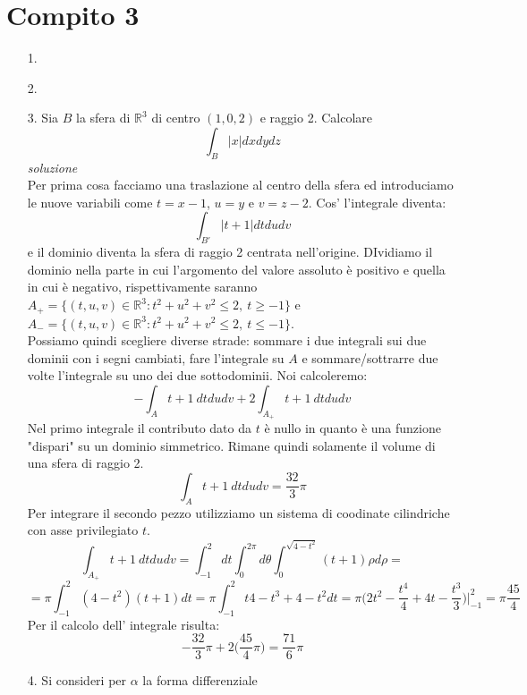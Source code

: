 \documentclass[a4paper]{article}
\begin{document}
\section*{Compito 3}
\begin{itemize}
\item [1.]
\item [2.]
\item [3.] Sia $B$ la sfera di $\mathbb{R}^3$ di centro $(1,0,2)$ e raggio 2. Calcolare
\begin{equation*}
\int_{B} |x| dxdydz
\end{equation*}
\emph{soluzione}\\
Per prima cosa facciamo una traslazione al centro della sfera ed introduciamo le nuove variabili come $t = x -1$, $u = y$ e $v = z -2$. Cos' l'integrale diventa:
\begin{equation}
\int_{B'} |t + 1| dtdudv
\end{equation}
e il dominio diventa la sfera di raggio 2 centrata nell'origine. DIvidiamo il dominio nella parte in cui l'argomento del valore assoluto è positivo e quella in cui è negativo, rispettivamente saranno \\$A_{+} = \{(t, u,v) \in \mathbb{R}^3 : t^2 + u^2 + v^2 \le 2, \: t \ge -1\}$ e \\$A_{-} = \{(t,u,v) \in \mathbb{R}^3 :t^2 + u^2 + v^2 \le 2, \: t \le -1\}$.\\
Possiamo quindi scegliere diverse strade: sommare i due integrali sui due dominii con i segni cambiati, fare l'integrale su $A$ e sommare/sottrarre due volte l'integrale su uno dei due sottodominii. Noi calcoleremo:
\begin{equation}
-\int_A t + 1 \: dtdudv + 2 \int_{A_{+}} t + 1 \: dtdudv
\end{equation}
Nel primo integrale il contributo dato da $t$ è nullo in quanto è una funzione "dispari" su un dominio simmetrico. Rimane quindi solamente il volume di una sfera di raggio 2.
\begin{equation}
\int_A t+1 \: dtdudv = \frac{32}{3} \pi
\end{equation}
Per integrare il secondo pezzo utilizziamo un sistema di coodinate cilindriche con asse privilegiato $t$. 
\begin{equation}
\int_{A_{+}} t+ 1 \: dtdudv = \int_{-1}^{2}dt \int_0^{2\pi} d\theta \int_{0}^{\sqrt{4-t^2}} (t+1) \rho d\rho =
\end{equation}
\begin{equation*}
=\pi \int_{-1}^{2} (4- t^2)(t + 1) dt = \pi \int_{-1}^{2} t4 - t^3 + 4 -t^2 dt = \pi \Big(2t^2 -\frac{t^4}{4} + 4t -\frac{t^3}{3}\Big)\Big|_{-1}^{2} = \pi \frac{45}{4}
\end{equation*}
Per il calcolo dell' integrale risulta:
\begin{equation}
-\frac{32}{3} \pi + 2 \Big( \frac{45}{4} \pi \Big) = \frac{71}{6}\pi
\end{equation}
\item [4.] Si consideri per $\alpha $ la forma differenziale


\end{itemize}
\end{document}
